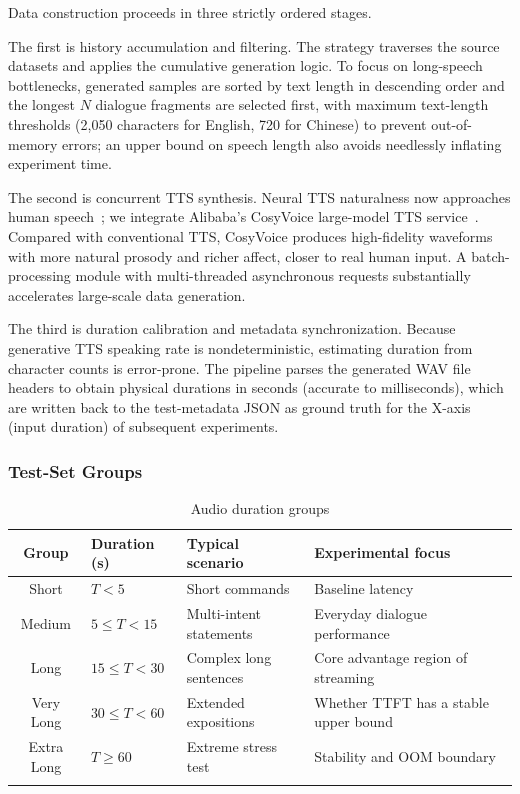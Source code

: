 \documentclass[pdflatex,iicol,Numbered,sn-basic]{sn-jnl}%
\begin{document}
Data construction proceeds in three strictly ordered stages.

The first is history accumulation and filtering. The strategy traverses the source datasets and applies the cumulative generation logic. To focus on long-speech bottlenecks, generated samples are sorted by text length in descending order and the longest $N$ dialogue fragments are selected first, with maximum text-length thresholds (2,050 characters for English, 720 for Chinese) to prevent out-of-memory errors; an upper bound on speech length also avoids needlessly inflating experiment time.

The second is concurrent TTS synthesis. Neural TTS naturalness now approaches human speech~\cite{ref16}; we integrate Alibaba's CosyVoice large-model TTS service~\cite{ref17}. Compared with conventional TTS, CosyVoice produces high-fidelity waveforms with more natural prosody and richer affect, closer to real human input. A batch-processing module with multi-threaded asynchronous requests substantially accelerates large-scale data generation.

The third is duration calibration and metadata synchronization. Because generative TTS speaking rate is nondeterministic, estimating duration from character counts is error-prone. The pipeline parses the generated WAV file headers to obtain physical durations in seconds (accurate to milliseconds), which are written back to the test-metadata JSON as ground truth for the X-axis (input duration) of subsequent experiments.

\subsubsection{Test-Set Groups}

\begin{table}[htbp]
\caption{Audio duration groups}\label{tab:groups}
\begin{tabular}{@{}clll@{}}
\toprule
Group & Duration (s) & Typical scenario & Experimental focus \\
\midrule
Short & $T<5$ & Short commands & Baseline latency \\
Medium & $5\leq T<15$ & Multi-intent statements & Everyday dialogue performance \\
Long & $15\leq T<30$ & Complex long sentences & Core advantage region of streaming \\
Very Long & $30\leq T<60$ & Extended expositions & Whether TTFT has a stable upper bound \\
Extra Long & $T\geq60$ & Extreme stress test & Stability and OOM boundary \\
\botrule
\end{tabular}
\end{table}
\end{document}
